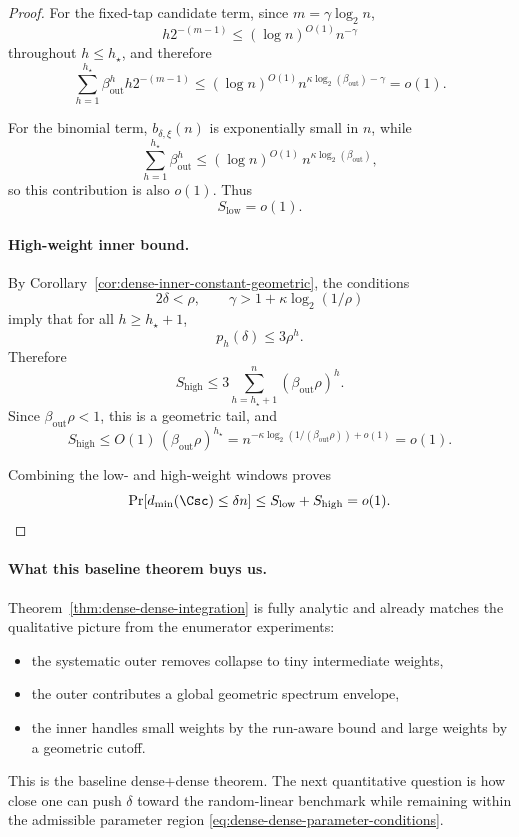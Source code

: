 \begin{proof}
For the fixed-tap candidate term, since \(m=\gamma\log_2 n\),
\[
h2^{-(m-1)}\le (\log n)^{O(1)}n^{-\gamma}
\]
throughout \(h\le h_\star\), and therefore
\[
\sum_{h=1}^{h_\star}\beta_{\mathrm{out}}^h h2^{-(m-1)}
\le
(\log n)^{O(1)}n^{\kappa\log_2(\beta_{\mathrm{out}})-\gamma}
=o(1).
\]

For the binomial term, \(b_{\delta,\xi}(n)\) is exponentially small in \(n\), while
\[
\sum_{h=1}^{h_\star} \beta_{\mathrm{out}}^h
\le
(\log n)^{O(1)}\,n^{\kappa\log_2(\beta_{\mathrm{out}})},
\]
so this contribution is also \(o(1)\).
Thus
\[
S_{\mathrm{low}}=o(1).
\]

\paragraph{High-weight inner bound.}
By Corollary~\ref{cor:dense-inner-constant-geometric}, the conditions
\[
2\delta<\rho,
\qquad
\gamma>1+\kappa\log_2(1/\rho)
\]
imply that for all \(h\ge h_\star+1\),
\[
p_h(\delta)\le 3\rho^h.
\]
Therefore
\[
S_{\mathrm{high}}
\le
3\sum_{h=h_\star+1}^{n}(\beta_{\mathrm{out}}\rho)^h.
\]
Since \(\beta_{\mathrm{out}}\rho<1\), this is a geometric tail, and
\[
S_{\mathrm{high}}
\le
O(1)\,(\beta_{\mathrm{out}}\rho)^{h_\star}
=
n^{-\kappa\log_2(1/(\beta_{\mathrm{out}}\rho))+o(1)}
=o(1).
\]

Combining the low- and high-weight windows proves
\[
\Pr[d_{\min}(\Csc)\le \delta n]
\le
S_{\mathrm{low}}+S_{\mathrm{high}}
=
o(1).
\]
\end{proof}

\paragraph{What this baseline theorem buys us.}
Theorem~\ref{thm:dense-dense-integration} is fully analytic and already matches the qualitative picture from the
enumerator experiments:
\begin{itemize}
\item the systematic outer removes collapse to tiny intermediate weights,
\item the outer contributes a global geometric spectrum envelope,
\item the inner handles small weights by the run-aware bound and large weights by a geometric cutoff.
\end{itemize}
This is the baseline dense+dense theorem. The next quantitative question is how close one can push \(\delta\) toward
the random-linear benchmark while remaining within the admissible parameter region
\eqref{eq:dense-dense-parameter-conditions}.

